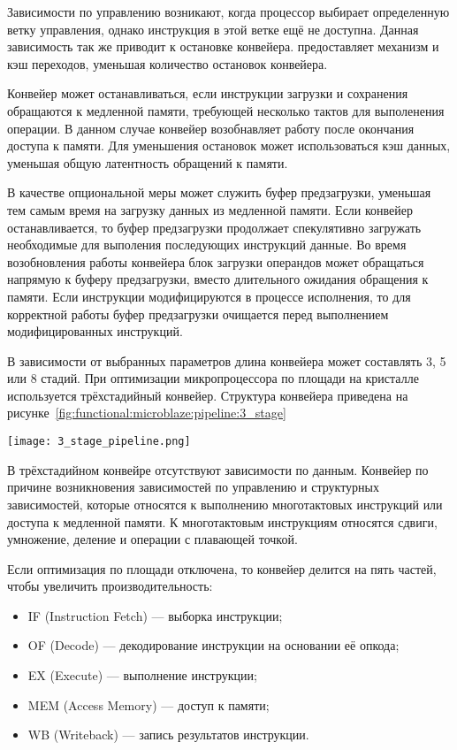 Зависимости по управлению возникают, когда процессор выбирает определенную ветку управления, однако инструкция
в этой ветке ещё не доступна. Данная зависимость так же приводит к остановке конвейера.  предоставляет
механизм  и кэш переходов, уменьшая количество остановок конвейера.

Конвейер может останавливаться, если инструкции загрузки и сохранения обращаются к медленной памяти, требующей
несколько тактов для выполенения операции. В данном случае конвейер возобнавляет работу после окончания доступа к
памяти. Для уменьшения остановок может использоваться кэш данных, уменьшая общую латентность обращений к памяти.

В качестве опциональной меры может служить буфер предзагрузки, уменьшая тем самым время на загрузку данных из
медленной памяти. Если конвейер останавливается, то буфер предзагрузки продолжает спекулятивно загружать необходимые
для выполения последующих инструкций данные. Во время возобновления работы конвейера блок загрузки операндов может
обращаться напрямую к буферу предзагрузки, вместо длительного ожидания обращения к памяти. Если инструкции модифицируются
в процессе исполнения, то для корректной работы буфер предзагрузки очищается перед выполнением модифицированных инструкций.

В зависимости от выбранных параметров длина конвейера может составлять 3, 5 или 8 стадий.
При оптимизации микропроцессора по площади на кристалле используется трёхстадийный конвейер. Структура конвейера
приведена на рисунке~\ref{fig:functional:microblaze:pipeline:3_stage}

\begin{center}
  \centering
  \texttt{[image: 3\_stage\_pipeline.png]}
  \label{fig:functional:microblaze:pipeline:3_stage}
\end{center}

В трёхстадийном конвейре отсутствуют зависимости по данным. Конвейер по причине возникновения
зависимостей по управлению и структурных зависимостей, которые относятся к выполнению многотактовых
инструкций или доступа к медленной памяти. К многотактовым инструкциям относятся сдвиги, умножение,
деление и операции с плавающей точкой.

Если оптимизация по площади отключена, то конвейер делится на пять частей, чтобы увеличить
производительность:
\begin{itemize}
  \item IF (Instruction Fetch) --- выборка инструкции;
  \item OF (Decode) --- декодирование инструкции на основании её опкода;
  \item EX (Execute) --- выполнение инструкции;
  \item MEM (Access Memory) --- доступ к памяти;
  \item WB (Writeback) --- запись результатов инструкции.
\end{itemize}

